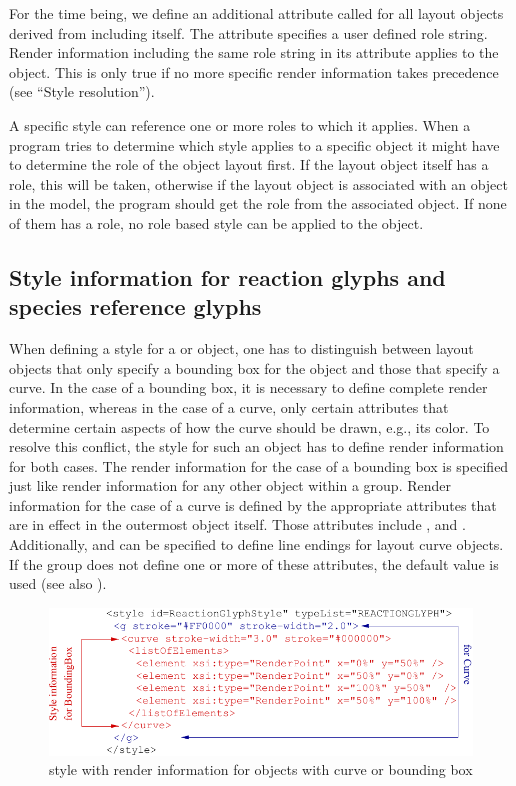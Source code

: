 For the time being, we define an additional attribute called  for all 
layout objects derived from \GraphicalObject including \GraphicalObject itself.
The attribute specifies a user defined role string. Render information including the same role string in its
 attribute applies to the object. This is only true if no more specific render information
takes precedence (see ``Style resolution'').
 
A specific style can reference one or more roles to which it applies. When a program tries to determine which style applies to a 
specific object it might have to determine the role of the object layout first. If the 
layout object itself has a role, this will be taken, otherwise if the layout object 
is associated with an object in the model, the program should get the role from 
the associated object. If none of them has a role, no role based style can be 
applied to the object.

\subsection{Style information for reaction glyphs and species reference glyphs}

When defining a style for a  or  object, one 
has to distinguish between layout objects that only specify a bounding box for the 
object and those that specify a curve. In the case of a bounding box, it is necessary to 
define complete render information, whereas in the case of a curve, only 
certain attributes that determine certain aspects of how the 
curve should be drawn, e.g., its color. To resolve this conflict, the style for such an 
object has to define render information for both cases. The render information 
for the case of a bounding box is specified just like render information for 
any other object within a group. Render information for the case of a curve is 
defined by the appropriate attributes that are in effect in the outermost \RenderGroup 
object itself. Those attributes include ,  
and . Additionally,  and  can be 
specified to define line endings for layout curve objects. If the group does not define 
one or more of these attributes, the default value is used (see also ).

\begin{figure}[!ht]
\begin{center}
\includegraphics{figures/CurveAndBBStyle.pdf}
\end{center}
\caption{style with render information for objects with curve or bounding box}
\label{CurveAndBBStyle}
\end{figure}

